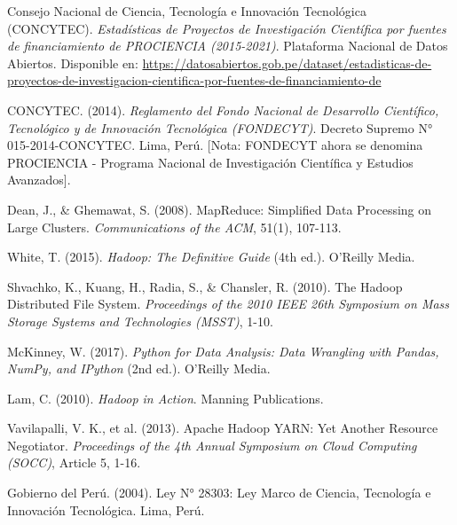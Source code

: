 \documentclass[12pt,a4paper]{article}
\begin{document}
\begin{enumerate}[label={[\arabic*]}, leftmargin=*]
    \item Consejo Nacional de Ciencia, Tecnología e Innovación Tecnológica (CONCYTEC). \textit{Estadísticas 
    de Proyectos de Investigación Científica por fuentes de financiamiento de PROCIENCIA (2015-2021)}. 
    Plataforma Nacional de Datos Abiertos. Disponible en: 
    \url{https://datosabiertos.gob.pe/dataset/estadisticas-de-proyectos-de-investigacion-cientifica-por-fuentes-de-financiamiento-de}
    
    \item CONCYTEC. (2014). \textit{Reglamento del Fondo Nacional de Desarrollo Científico, Tecnológico 
    y de Innovación Tecnológica (FONDECYT)}. Decreto Supremo N° 015-2014-CONCYTEC. Lima, Perú. [Nota: FONDECYT 
    ahora se denomina PROCIENCIA - Programa Nacional de Investigación Científica y Estudios Avanzados].
    
    \item Dean, J., \& Ghemawat, S. (2008). MapReduce: Simplified Data Processing on Large Clusters. 
    \textit{Communications of the ACM}, 51(1), 107-113.
    
    \item White, T. (2015). \textit{Hadoop: The Definitive Guide} (4th ed.). O'Reilly Media.
    
    \item Shvachko, K., Kuang, H., Radia, S., \& Chansler, R. (2010). The Hadoop Distributed File System. 
    \textit{Proceedings of the 2010 IEEE 26th Symposium on Mass Storage Systems and Technologies (MSST)}, 1-10.
    
    \item McKinney, W. (2017). \textit{Python for Data Analysis: Data Wrangling with Pandas, NumPy, 
    and IPython} (2nd ed.). O'Reilly Media.
    
    \item Lam, C. (2010). \textit{Hadoop in Action}. Manning Publications.
    
    \item Vavilapalli, V. K., et al. (2013). Apache Hadoop YARN: Yet Another Resource Negotiator. 
    \textit{Proceedings of the 4th Annual Symposium on Cloud Computing (SOCC)}, Article 5, 1-16.
    
    \item Gobierno del Perú. (2004). Ley N° 28303: Ley Marco de Ciencia, Tecnología e Innovación 
    Tecnológica. Lima, Perú.

\end{enumerate}
\end{document}
